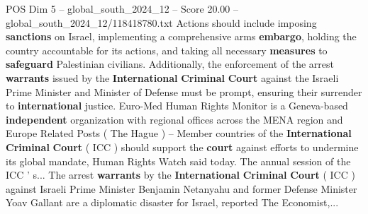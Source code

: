 \begin{textsample}{POS Dim 5 – global\_south\_2024\_12 – Score 20.00 – global\_south\_2024\_12/118418780.txt}
Actions should include imposing \textbf{sanctions} on Israel, implementing a comprehensive arms \textbf{embargo}, holding the country accountable for its actions, and taking all necessary \textbf{measures} to \textbf{safeguard} Palestinian civilians.
Additionally, the enforcement of the arrest \textbf{warrants} issued by the \textbf{International} \textbf{Criminal} \textbf{Court} against the Israeli Prime Minister and Minister of Defense must be prompt, ensuring their surrender to \textbf{international} justice.
Euro-Med Human Rights Monitor is a Geneva-based \textbf{independent} organization with regional offices across the MENA region and Europe Related Posts ( The Hague ) -- Member countries of the \textbf{International} \textbf{Criminal} \textbf{Court} ( ICC ) should support the \textbf{court} against efforts to undermine its global mandate, Human Rights Watch said today.
The annual session of the ICC ' s...
The arrest \textbf{warrants} by the \textbf{International} \textbf{Criminal} \textbf{Court} ( ICC ) against Israeli Prime Minister Benjamin Netanyahu and former Defense Minister Yoav Gallant are a diplomatic disaster for Israel, reported The Economist,...

\end{textsample}
